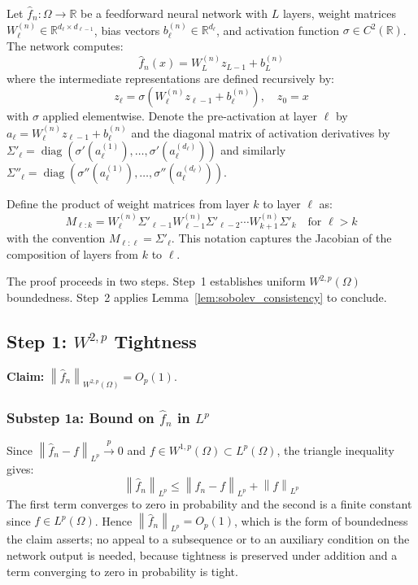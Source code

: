 \documentclass[12pt,a4paper]{article}
\numberwithin{equation}{section}
\theoremstyle{plain}
\theoremstyle{definition}
\newcommand{\norm}[1]{\left\| #1 \right\|}
\newcommand{\R}{\mathbb{R}}
\newcommand{\Lp}{L^p(\Omega)}
\newcommand{\Wonep}{W^{1,p}(\Omega)}
\newcommand{\Wtwop}{W^{2,p}(\Omega)}
\newcommand{\fn}{\hat{f}_n}
\newcommand{\xrightarrowp}{\xrightarrow{p}}
\begin{document}
	Let $\fn: \Omega \to \R$ be a feedforward neural network with $L$ layers,
	weight matrices $W_\ell^{(n)} \in \R^{d_\ell \times d_{\ell-1}}$, bias vectors
	$b_\ell^{(n)} \in \R^{d_\ell}$, and activation function $\sigma \in C^2(\R)$.
	The network computes:
	\begin{equation}
		\fn(x) = W_L^{(n)} z_{L-1} + b_L^{(n)}
	\end{equation}
	where the intermediate representations are defined recursively by:
	\begin{equation}
		z_\ell = \sigma\!\left(W_\ell^{(n)} z_{\ell-1} + b_\ell^{(n)}\right),
		\quad z_0 = x
	\end{equation}
	with $\sigma$ applied elementwise. Denote the pre-activation at layer $\ell$
	by $a_\ell = W_\ell^{(n)} z_{\ell-1} + b_\ell^{(n)}$ and the diagonal
	matrix of activation derivatives by $\Sigma'_\ell = \operatorname{diag}
	(\sigma'(a_\ell^{(1)}), \ldots, \sigma'(a_\ell^{(d_\ell)}))$ and similarly
	$\Sigma''_\ell = \operatorname{diag}(\sigma''(a_\ell^{(1)}), \ldots,
	\sigma''(a_\ell^{(d_\ell)}))$.
	
	Define the product of weight matrices from layer $k$ to layer $\ell$ as:
	\begin{equation}
		M_{\ell:k} = W_\ell^{(n)} \Sigma'_{\ell-1} W_{\ell-1}^{(n)}
		\Sigma'_{\ell-2} \cdots W_{k+1}^{(n)} \Sigma'_k
		\quad \text{for } \ell > k
	\end{equation}
	with the convention $M_{\ell:\ell} = \Sigma'_\ell$. This notation captures
	the Jacobian of the composition of layers from $k$ to $\ell$.
	
	The proof proceeds in two steps. Step~1 establishes uniform $\Wtwop$
	boundedness. Step~2 applies Lemma~\ref{lem:sobolev_consistency} to conclude.
	
	\subsection{Step 1: $W^{2,p}$ Tightness}
	
	\textbf{Claim:} $\norm{\fn}_{\Wtwop} = O_p(1)$.
	
	\subsubsection*{Substep 1a: Bound on $\fn$ in $L^p$}
	
	Since $\norm{\fn - f}_{L^p} \xrightarrowp 0$ and $f \in \Wonep \subset \Lp$,
	the triangle inequality gives:
	\begin{equation}
		\norm{\fn}_{L^p} \leq \norm{\fn - f}_{L^p} + \norm{f}_{L^p}
	\end{equation}
	The first term converges to zero in probability and the second is a finite
	constant since $f \in \Lp$. Hence $\norm{\fn}_{L^p} = O_p(1)$, which is the
	form of boundedness the claim asserts; no appeal to a subsequence or to an
	auxiliary condition on the network output is needed, because tightness is
	preserved under addition and a term converging to zero in probability is
	tight.
	
\end{document}
